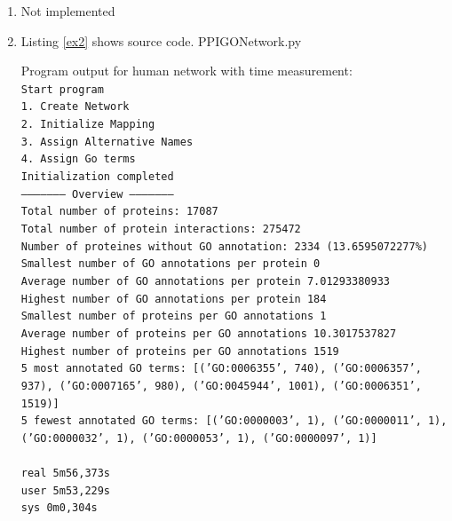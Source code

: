 \documentclass[10pt,a4paper]{article}
\begin{document}
\begin{enumerate}
\item Not implemented

\item Listing \ref{ex2} shows source code.
 {PPIGONetwork.py}

Program output for human network with time measurement:\\
\texttt{Start program\\
1. Create Network\\
2. Initialize Mapping\\
3. Assign Alternative Names\\
4. Assign Go terms\\
Initialization completed\\
--------------------- Overview ---------------------\\
Total number of proteins:			17087\\
Total number of protein interactions:		275472\\
Number of proteines without GO annotation:	2334 (13.6595072277\%)\\
Smallest number of GO annotations per protein	0\\
Average number of GO annotations per protein	7.01293380933\\
Highest number of GO annotations per protein	184\\
Smallest number of proteins per GO annotations	1\\
Average number of proteins per GO annotations	10.3017537827\\
Highest number of proteins per GO annotations	1519\\
5 most annotated GO terms:	[('GO:0006355', 740), ('GO:0006357', 937), ('GO:0007165', 980), ('GO:0045944', 1001), ('GO:0006351', 1519)]\\
5 fewest annotated GO terms:	[('GO:0000003', 1), ('GO:0000011', 1), ('GO:0000032', 1), ('GO:0000053', 1), ('GO:0000097', 1)]\\
\\
real	5m56,373s\\
user	5m53,229s\\
sys	0m0,304s\\
}

\end{enumerate}
\end{document}
